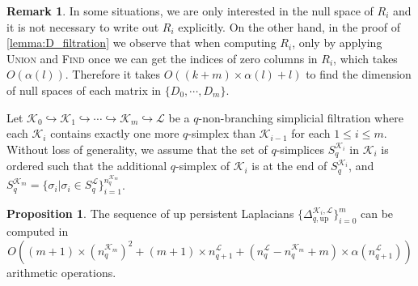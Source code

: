 \documentclass{article}
\theoremstyle{definition}
\newtheorem{remark}[theorem]{Remark}
\newtheorem{proposition}[theorem]{Proposition}
\newcommand{\KK}{\mathcal{K}}
\newcommand{\LL}{\mathcal{L}}
\begin{document}
\begin{remark}\label{rmk:filt_weak_red}
In some situations,
we are only interested in the null space of $R_i$ and it is not necessary to write out $R_i$ explicitly.
On the other hand, 
in the proof of \cref{lemma:D_filtration} we observe that when computing $R_i$,
only by applying \textsc{Union} and \textsc{Find} once we can get the indices of zero columns in $R_i$,
which takes $O(\alpha(l))$.
Therefore it takes $O\left((k+m)\times \alpha(l)+l\right)$ to find the dimension of null spaces of each matrix in $\{D_0, \cdots, D_m\}$. 
\end{remark}

Let $\KK_0\hookrightarrow\KK_1 \hookrightarrow\cdots\hookrightarrow \KK_m\hookrightarrow \LL$ be a $q$-non-branching simplicial filtration where each $\KK_i$ contains exactly one more $q$-simplex than $\KK_{i-1}$ for each $1\leq i\leq m$.
Without loss of generality,
we assume that the set of $q$-simplices $S_q^{\KK_i}$ in $\KK_i$ is ordered such that the additional $q$-simplex of $\KK_i$ is at the end of $S_q^{\KK_i}$,
and $S_q^{\KK_m}=\{\sigma_i|\sigma_i\in S_q^{\LL}\}_{i=1}^{n_q^{\KK_m}}$.




\begin{proposition}\label{prop:time_filtration}
The sequence of up persistent Laplacians $\{\Delta_{q, \mathrm{up}}^{\KK_i, \LL}\}_{i=0}^m$ can be computed in 
\[
O\left((m+1)\times (n_q^{\KK_m})^2+(m+1)\times n_{q+1}^\LL+(n_q^\LL-n_q^{\KK_m}+m)\times \alpha(n_{q+1}^\LL)\right)
\]
arithmetic operations.
\end{proposition}
\end{document}
